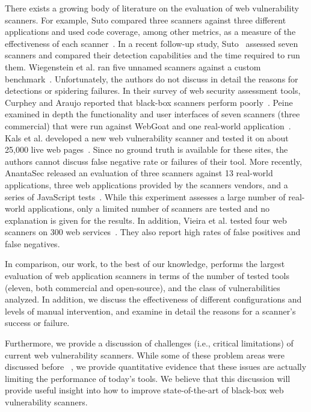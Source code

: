 There exists a growing body of literature on the evaluation of web
vulnerability scanners. For example, 
Suto compared three scanners against three different applications and
used code coverage, among other metrics, as a measure of the
effectiveness of each scanner~\cite{suto07}. In a recent follow-up study,
Suto~\cite{suto10webscanners} assessed seven scanners and compared
their detection capabilities and the time required to run them.
Wiegenstein et al. ran five unnamed scanners against a custom
benchmark~\cite{wiegenstein06}. Unfortunately, the authors do not discuss in
detail the reasons for detections or spidering failures.
In their survey of web security assessment tools, Curphey
and Araujo reported that black-box scanners perform
poorly~\cite{curphey06}.
Peine examined in depth the functionality and user interfaces of seven
scanners (three commercial) that were run against WebGoat
and one real-world application~\cite{peine06}.
Kals et al. developed a new web vulnerability scanner and tested it on
about 25,000 live web pages~\cite{kals06secubat}. Since no ground
truth is available for these sites, the authors cannot discuss false
negative rate or failures of their tool.
More recently, AnantaSec released an evaluation of three scanners against
13 real-world applications, three web applications provided by the 
scanners vendors, and a series of JavaScript tests~\cite{anantasec09}. 
While this experiment assesses a large number of real-world
applications, only a limited number of scanners are tested and no
explanation is given for the results.
In addition, Vieira et al. tested four web scanners on 300 web
services~\cite{vieira09}. They also report high rates of false
positives and false negatives.

In comparison, our work, to the best of our knowledge, performs the largest evaluation of web
application scanners in terms of the number of tested tools (eleven,
both commercial and open-source), and the class of vulnerabilities analyzed.
In addition, we discuss the effectiveness of different
configurations and levels of manual intervention, and examine in detail
the reasons for a scanner's success or failure.

Furthermore, we provide a discussion of challenges (i.e., critical
limitations) of current web vulnerability scanners. While some of these
problem areas were discussed before ~\cite{grossman04,mcallister08}, we provide quantitative
evidence that these issues are actually limiting the performance of
today's tools.
We believe that this discussion will provide useful insight into
how to improve state-of-the-art of black-box web vulnerability scanners.

